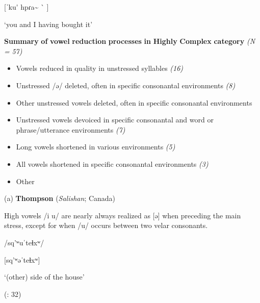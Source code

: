 [ˈku\'{} hpɾa\~{} \`{} ]



‘you and I having bought it’



\citep[23]{Holt1999}

\z


\ea\label{ex:(6.19)}
  \textbf{Summary} \textbf{of} \textbf{vowel} \textbf{reduction} \textbf{processes} \textbf{in} \textbf{Highly} \textbf{Complex} \textbf{category} \textit{(N} \textit{=} \textit{57)}


\begin{itemize}
\item 
Vowels reduced in quality in unstressed syllables \textit{(16)}

\item 
Unstressed /ə/ deleted, often in specific consonantal environments \textit{(8)}

\item 
Other unstressed vowels deleted, often in specific consonantal environments \textit{}

\item 
Unstressed vowels devoiced in specific consonantal and word or phrase/utterance environments \textit{(7)}

\item 
Long vowels shortened in various environments \textit{(5)}

\item 
All vowels shortened in specific consonantal environments \textit{(3)}

\item 
Other \textit{}

\end{itemize}

(a)  \textbf{Thompson} (\textit{Salishan}; Canada)



High vowels /i u/ are nearly always realized as [ə] when preceding the main stress, except for when /u/ occurs between two velar consonants. 



/sq’ʷuˈteɬxʷ/



[sq’ʷəˈteɬxʷ]



‘(other) side of the house’



(\citealt{ThompsonThompson1992}: 32)



